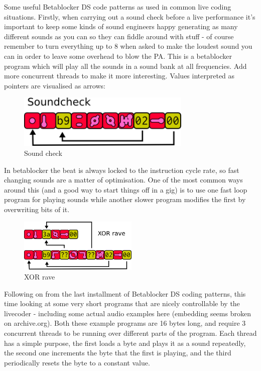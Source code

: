 \documentclass[letterpaper, 12pt]{article}
\begin{document}
Some useful Betablocker DS code patterns as used in common live coding situations.
Firstly, when carrying out a sound check before a live performance it's important to keep some kinds of sound engineers happy generating as many different sounds as you can so they can fiddle around with stuff - of course remember to turn everything up to 8 when asked to make the loudest sound you can in order to leave some overhead to blow the PA.
This is a betablocker program which will play all the sounds in a sound bank at all frequencies. Add more concurrent threads to make it more interesting. Values interpreted as pointers are visualised as arrows:


\begin{figure}
	\centering
		\includegraphics[height=1in]{bbds-sndchk1}
	\caption{Sound check}
	\label{fig:fig_bbds-sndchk1}
\end{figure}

In betablocker the beat is always locked to the instruction cycle rate, so fast changing sounds are a matter of optimisation. One of the most common ways around this (and a good way to start things off in a gig) is to use one fast loop program for playing sounds while another slower program modifies the first by overwriting bits of it. 

\begin{figure}
	\centering
		\includegraphics[height=1in]{bbds-xorrave}
	\caption{XOR rave}
	\label{fig:fig_bbds-xorrave}
\end{figure}

Following on from the last installment of Betablocker DS coding patterns, this time looking at some very short programs that are nicely controllable by the livecoder - including some actual audio examples here (embedding seems broken on archive.org).
Both these example programs are 16 bytes long, and require 3 concurrent threads to be running over different parts of the program. Each thread has a simple purpose, the first loads a byte and plays it as a sound repeatedly, the second one increments the byte that the first is playing, and the third periodically resets the byte to a constant value.
 
\end{document}
